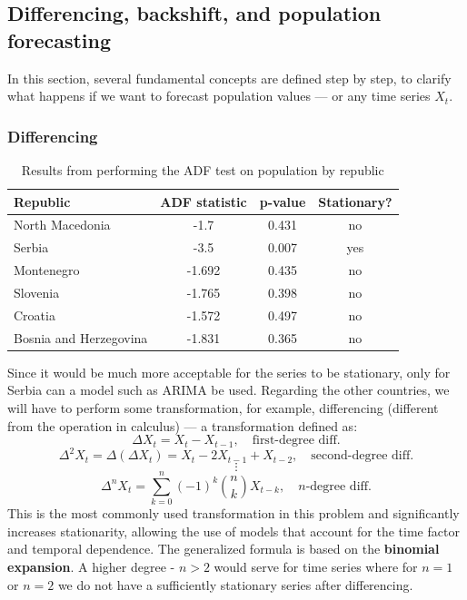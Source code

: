 \documentclass[a4paper,11pt]{article}
\begin{document}
\subsection{Differencing, backshift, and population forecasting}
In this section, several fundamental concepts are defined step by step, to clarify what happens if we want to forecast population values — or any time series $X_t$.
\subsubsection{Differencing}
\begin{table}[H]
\centering
\begin{tabular}{|l|c|c|c|}
\hline
\textbf{Republic} & \textbf{ADF statistic} & \textbf{p-value} & \textbf{Stationary?} \\
\hline
North Macedonia & -1.7 & 0.431 & no \\
Serbia & -3.5 & 0.007 & yes \\
Montenegro & -1.692 & 0.435 & no \\
Slovenia & -1.765 & 0.398&  no \\
Croatia & -1.572 & 0.497 & no \\
Bosnia and Herzegovina & -1.831 & 0.365 & no \\
\hline
\end{tabular}
\caption{Results from performing the ADF test on population by republic}
\label{tab:adf-test-results}
\end{table}
Since it would be much more acceptable for the series to be stationary, only for Serbia can a model such as ARIMA be used. Regarding the other countries, we will have to perform some transformation, for example, differencing (different from the operation in calculus) — a transformation defined as:
\begin{equation}
    \label{eq:differencing-first-deg}
\Delta X_t = X_t - X_{t-1},\quad\text{first-degree diff.}
\end{equation}
$$
\Delta^2 X_t = \Delta (\Delta X_t) = X_t - 2X_{t-1} + X_{t-2}, \quad\text{second-degree diff.}
$$
$$
\vdots
$$
\begin{equation}
    \label{eq:differencing-general-case}
    \Delta^n X_t = \sum_{k=0}^{n} (-1)^k \binom{n}{k} X_{t-k}, \quad\text{$n$-degree diff.}
\end{equation}
This is the most commonly used transformation in this problem and significantly increases stationarity, allowing the use of models that account for the time factor and temporal dependence. The generalized formula is based on the \textbf{binomial expansion}. A higher degree - $n > 2$ would serve for time series where for $n=1$ or $n=2$ we do not have a sufficiently stationary series after differencing.
\end{document}
